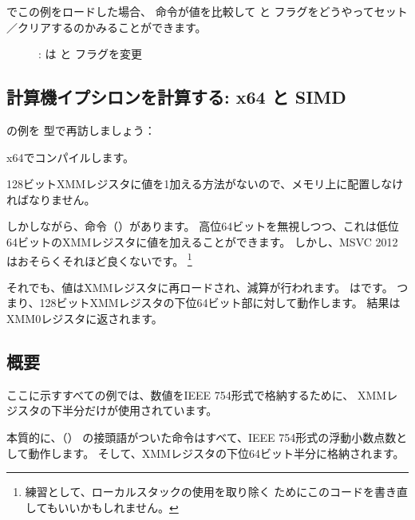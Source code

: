 \olly でこの例をロードした場合、
命令が値を比較して \CF と \PF フラグをどうやってセット／クリアするのかみることができます。

\begin{figure}[H]
\centering
{}
\caption{\olly:  は \CF と \PF フラグを変更}
\label{fig:FPU_SIMD_d_max_olly}
\end{figure}

\subsection{計算機イプシロンを計算する: x64 と SIMD}
\label{machine_epsilon_x64_and_SIMD}

の例を \Tdouble 型で再訪しましょう：

x64でコンパイルします。



128ビットXMMレジスタに値を1加える方法がないので、メモリ上に配置しなければなりません。

しかしながら、命令（）があります。
高位64ビットを無視しつつ、これは低位64ビットのXMMレジスタに値を加えることができます。
しかし、MSVC 2012はおそらくそれほど良くないです。
\footnote{練習として、ローカルスタックの使用を取り除く
ためにこのコードを書き直してもいいかもしれません。}

それでも、値はXMMレジスタに再ロードされ、減算が行われます。
はです。
つまり、128ビットXMMレジスタの下位64ビット部に対して動作します。
結果はXMM0レジスタに返されます。



\subsection{概要}

ここに示すすべての例では、数値をIEEE 754形式で格納するために、
XMMレジスタの下半分だけが使用されています。

本質的に、（）
の接頭語がついた命令はすべて、IEEE 754形式の浮動小数点数として動作します。
そして、XMMレジスタの下位64ビット半分に格納されます。

